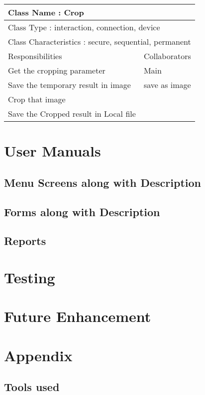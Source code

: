 \begin{tabular}{|l|l|}
  \hline
  \multicolumn{2}{|l|}{ Class Name : Crop} \\
  \hline
  \multicolumn{2}{|l|}{ Class Type : interaction, connection, device} \\
  \hline
  \multicolumn{2}{|l|}{ Class Characteristics : secure, sequential, permanent} \\
  \hline
  Responsibilities & Collaborators  \\
  \hline
  Get the cropping parameter & Main \\
  Save the temporary result in image & save as image \\
  Crop that image & \\
  Save the Cropped result in Local file & \\
  \hline
\end{tabular}



\chapter{User Manuals}
\section{Menu Screens along with Description}
\section{Forms along with Description}
\section{Reports}

\chapter{Testing}

\chapter{Future Enhancement}

\chapter{Appendix}
\section{Tools used}
